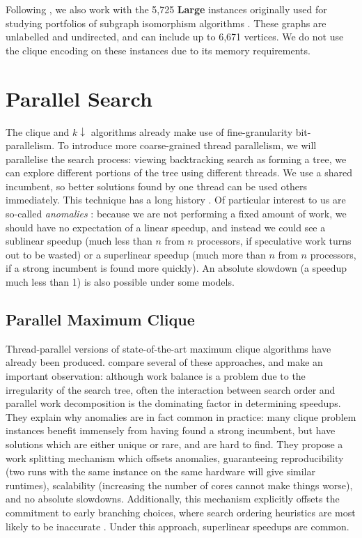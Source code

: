 \documentclass[sigconf]{acmart}
\begin{document}
\noindent
Following \citet{DBLP:conf/aaai/HoffmannMR17}, we also work with the 5,725 \textbf{Large} instances
originally used for studying portfolios of subgraph isomorphism algorithms
\citep{DBLP:conf/lion/KotthoffMS16}. These graphs are unlabelled and undirected, and can include up
to 6,671 vertices. We do not use the clique encoding on these instances due to its
memory requirements.

\section{Parallel Search}

The clique and $k{\downarrow}$ algorithms already make use of fine-granularity bit-parallelism. To
introduce more coarse-grained thread parallelism, we will parallelise the search process: viewing
backtracking search as forming a tree, we can explore different portions of the tree using different
threads. We use a shared incumbent, so better solutions found by one thread can be used others
immediately. This technique has a long history \citep{o:BaderHC05}. Of particular
interest to us are so-called \emph{anomalies}
\citep{DBLP:journals/cacm/LaiS84,DBLP:journals/tc/LiW86,DBLP:conf/irregular/BruinKT95}:
because we are not performing a fixed amount of work, we should have no expectation of a linear
speedup, and instead we could see a sublinear speedup (much less than $n$ from $n$ processors, if
speculative work turns out to be wasted) or a superlinear speedup (much more than $n$ from $n$
processors, if a strong incumbent is found more quickly). An absolute slowdown (a speedup much less
than 1) is also possible under some models.

\subsection{Parallel Maximum Clique}

Thread-parallel versions of state-of-the-art maximum clique algorithms have already been produced.
\citet{DBLP:journals/topc/McCreeshP15} compare several of these approaches, and make an important
observation: although work balance is a problem due to the irregularity of the search tree, often
the interaction between search order and parallel work decomposition is the dominating factor in
determining speedups. They explain why anomalies are in fact common in practice: many clique problem
instances benefit immensely from having found a strong incumbent, but have solutions which are
either unique or rare, and are hard to find. They propose a work splitting mechanism which offsets
anomalies, guaranteeing reproducibility (two runs with the same instance on the same hardware will
give similar runtimes), scalability (increasing the number of cores cannot make things worse), and
no absolute slowdowns.  Additionally, this mechanism explicitly offsets the commitment to early
branching choices, where search ordering heuristics are most likely to be inaccurate
\citep{DBLP:conf/ijcai/HarveyG95,DBLP:conf/cp/ChuSS09}. Under this approach, superlinear speedups
are common.
\end{document}
